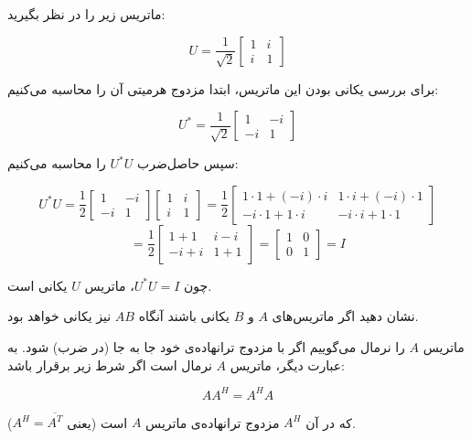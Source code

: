 \begin{example}
	ماتریس زیر را در نظر بگیرید:

\[
U = \frac{1}{\sqrt{2}} \begin{bmatrix}
	1 & i \\
	i & 1
\end{bmatrix}
\]

برای بررسی یکانی بودن این ماتریس، ابتدا مزدوج هرمیتی آن را محاسبه می‌کنیم:

\[
U^* = \frac{1}{\sqrt{2}} \begin{bmatrix}
	1 & -i \\
	-i & 1
\end{bmatrix}
\]

سپس حاصل‌ضرب \( U^* U \) را محاسبه می‌کنیم:

\[
U^* U = \frac{1}{2} \begin{bmatrix}
	1 & -i \\
	-i & 1
\end{bmatrix}
\begin{bmatrix}
	1 & i \\
	i & 1
\end{bmatrix}
= \frac{1}{2} \begin{bmatrix}
	1 \cdot 1 + (-i) \cdot i & 1 \cdot i + (-i) \cdot 1 \\
	-i \cdot 1 + 1 \cdot i & -i \cdot i + 1 \cdot 1
\end{bmatrix}
\]
\[
= \frac{1}{2} \begin{bmatrix}
	1 + 1 & i - i \\
	-i + i & 1 + 1
\end{bmatrix}
= \begin{bmatrix}
	1 & 0 \\
	0 & 1
\end{bmatrix}
= I
\]

چون \( U^* U = I \)، ماتریس \( U \) یکانی است.
\end{example}
\begin{exercise}
نشان دهید اگر ماتریس‌های 
$A$
و 
$B$
یکانی باشند آنگاه 
$AB$
نیز یکانی خواهد بود.
\end{exercise}
\begin{definition} 
	

ماتریس \( A \) را نرمال می‌گوییم اگر با مزدوج ترانهاده‌ی خود جا به جا (در ضرب) شود. به عبارت دیگر، ماتریس \( A \) نرمال است اگر شرط زیر برقرار باشد:

\[
A A^H = A^H A
\]

که در آن \( A^H \) مزدوج ترانهاده‌ی ماتریس \( A \) است (یعنی \( A^H = \overline{A^T} \)).

\end{definition}
